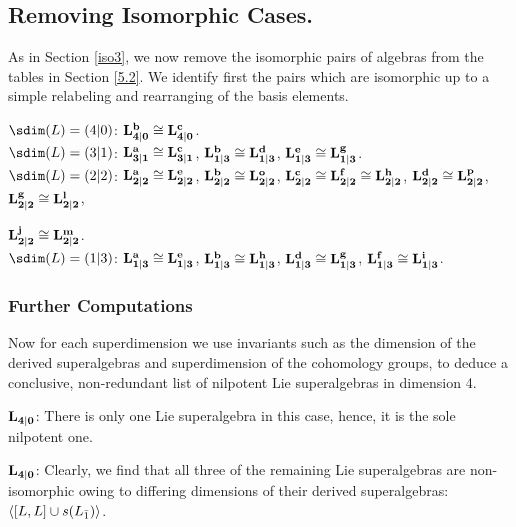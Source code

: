 \documentclass[12pt]{amsart}
\begin{document}
{\vspace{0.5em}

\subsection{Removing Isomorphic Cases.} As in Section \ref{iso3}, we now remove the isomorphic pairs of algebras from the tables in Section \ref{5.2}. We identify first the pairs which are isomorphic up to a simple relabeling and rearranging of the basis elements. 

\vspace{0.5 em}

\underline{$\sdim(L)=(4|0)$}: $\bf L^b_{4|0} \cong L^c_{4|0}$.\\

\underline{$\sdim(L)=(3|1)$}: $\bf L_{3|1}^a \cong L_{3|1}^c$, $\bf L^b_{1|3} \cong L^d_{1|3}$, $\bf L^e_{1|3} \cong L^g_{1|3}$.\\

\underline{$\sdim(L)=(2|2)$}: $\bf L^a_{2|2}\cong L^e_{2|2}$, $\bf L^b_{2|2} \cong L^o_{2|2}$, $\bf L^c_{2|2} \cong L^f_{2|2} \cong L^h_{2|2}$, $\bf L^d_{2|2} \cong L^p_{2|2}$, $\bf L^g_{2|2} \cong L^l_{2|2}$, 

$\bf L^j_{2|2} \cong L^m_{2|2}$.\\

\underline{$\sdim(L)=(1|3)$}: $\bf L^a_{1|3} \cong L^e_{1|3}$, $\bf L^b_{1|3} \cong L^h_{1|3}$, $\bf L^d_{1|3} \cong L^g_{1|3}$, $\bf L^f_{1|3} \cong L^i_{1|3}$.

\vspace{0.5 em}

\subsubsection{Further Computations}

Now for each superdimension we use invariants such as the dimension of the derived superalgebras and superdimension of the cohomology groups, to deduce a conclusive, non-redundant list of nilpotent Lie superalgebras in dimension 4.

\vspace{0.5 em}

\underline{$\bf L_{4|0}$}: There is only one Lie superalgebra in this case, hence, it is the sole nilpotent one.

\vspace{0.5 em}

\underline{$\bf L_{4|0}$}: Clearly, we find that all three of the remaining Lie superalgebras are non-isomorphic owing to differing dimensions of their derived superalgebras: $\langle[L,L] \cup s(L_{{\bar1}})\rangle$. 

}
\end{document}
